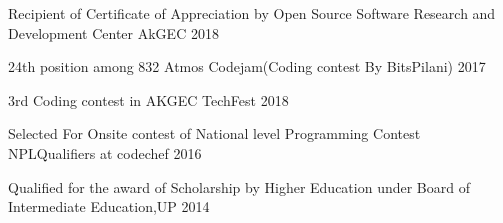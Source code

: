 \cvsubsection{}
\begin{cvhonors}
  \cvhonor
    {Recipient of Certificate of Appreciation by Open Source Software Research and 	Development Center } %
    {} %
    {AkGEC} %
    {2018} %
    
\end{cvhonors}






\begin{cvhonors}

  \cvhonor
    {24th position among 832 } %
    {Atmos Codejam(Coding contest By BitsPilani)} %
    {} %
    {2017} %

  \cvhonor
    {3rd} %
    {Coding contest in AKGEC TechFest} %
    {} %
    {2018} %

  \cvhonor
    {Selected For Onsite contest of National level Programming Contest} %
    {NPLQualifiers at codechef} %
    {} %
    {2016} %
    
 \cvhonor
    {Qualified for the award of Scholarship by Higher Education under Board of Intermediate Education,UP} %
  	{} %
    {} %
    {2014} %
    









 

\end{cvhonors}

